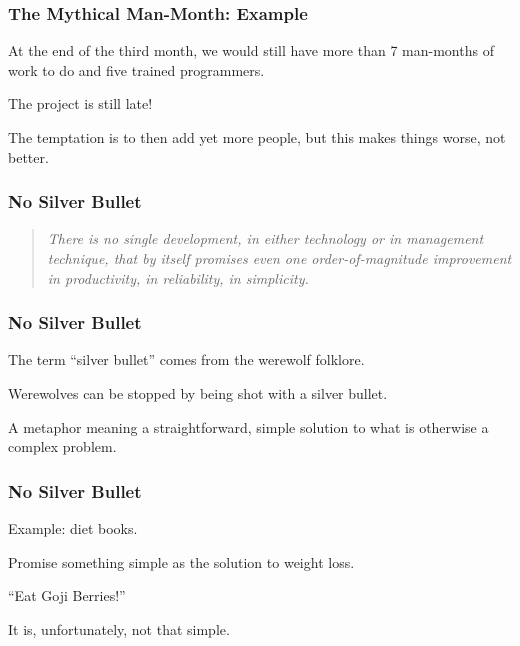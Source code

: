 \begin{frame}
\frametitle{The Mythical Man-Month: Example}
\begin{changemargin}{1cm}
At the end of the third month, we would still have more than 7 man-months of work to do and five trained programmers. 

The project is still late! 

The temptation is to then add yet more people, but this makes things worse, not better. 

\end{changemargin}
\end{frame}

\begin{frame}
\frametitle{No Silver Bullet}
\begin{changemargin}{1cm}
\begin{quote}
\textit{There is no single development, in either technology or in management technique, that by itself promises even one order-of-magnitude improvement in productivity, in reliability, in simplicity.}
\end{quote}

\end{changemargin}
\end{frame}

\begin{frame}
\frametitle{No Silver Bullet}
\begin{changemargin}{1cm}
The term ``silver bullet'' comes from the werewolf folklore.

Werewolves can be stopped by being shot with a silver bullet.

A metaphor meaning a straightforward, simple solution to what is otherwise a complex problem. 

\end{changemargin}
\end{frame}

\begin{frame}
\frametitle{No Silver Bullet}
\begin{changemargin}{1cm}
Example: diet books. 

Promise something simple as the solution to weight loss.

``Eat Goji Berries!'' 

It is, unfortunately, not that simple. 

\end{changemargin}
\end{frame}


